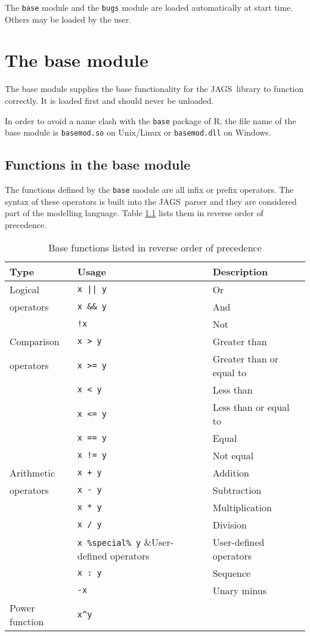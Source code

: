 \documentclass[11pt, a4paper, titlepage]{report}
\newcommand{\JAGS}{\textsf{JAGS}}
\begin{document}
The \verb+base+ module and the \verb+bugs+ module are loaded automatically
at start time.  Others may be loaded by the user.

\chapter{The base module}

The base module supplies the base functionality for the \JAGS\ library
to function correctly. It is loaded first and should never be
unloaded.

In order to avoid a name clash with the \texttt{base} package of R,
the file name of the base module is \texttt{basemod.so} on Unix/Linux
or \texttt{basemod.dll} on Windows.

\section{Functions in the base module}
\label{section:base:functions}

The functions defined by the \texttt{base} module are all infix or
prefix operators. The syntax of these operators is built into the
\JAGS\ parser and they are considered part of the modelling language.
Table \ref{table:base:functions} lists them in reverse order of
precedence.

\begin{table}[h]
\begin{center}
\begin{tabular}{lll}
\hline
Type & Usage & Description\\ 
\hline
Logical           & \verb+x || y+ & Or \\
operators         & \verb+x && y+ & And \\
                  & \verb+!x+     & Not \\
\hline
Comparison  & \verb+x > y+ & Greater than\\
operators   & \verb+x >= y+ & Greater than or equal to  \\
            & \verb+x < y+ & Less than \\
            & \verb+x <= y+ & Less than or equal to \\
            & \verb+x == y+ & Equal \\
            & \verb+x != y+ & Not equal \\
\hline
Arithmetic  & \verb-x + y- & Addition \\
operators   & \verb+x - y+ & Subtraction\\
            & \verb+x * y+ & Multiplication \\
            & \verb+x / y+ & Division \\
            & \verb+x %special% y+ &User-defined operators\\
            & \verb+x : y+ & Sequence \\
            & \verb+-x+ & Unary minus\\
\hline
Power function & \verb+x^y+ & \\
\hline
\end{tabular}
\caption{Base functions listed in reverse order of precedence 
  \label{table:base:functions}}
\end{center}
\end{table}
\end{document}

